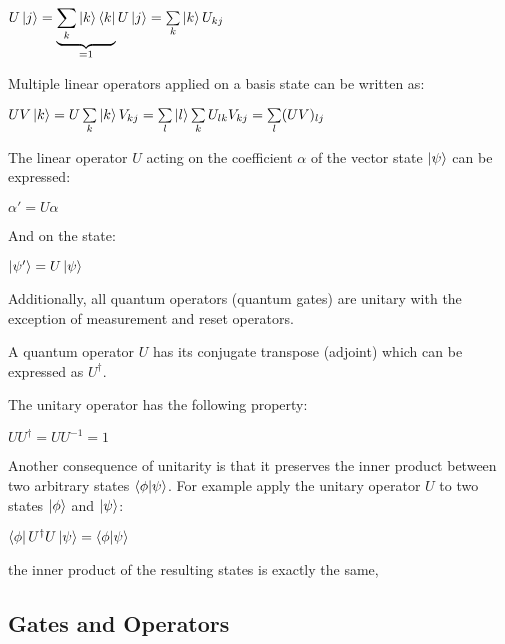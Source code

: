 \documentclass{article}
\begin{document}
\qquad $U\ket{j} = \underbrace{\sum\limits_k\ket{k}\bra{k}}_{ = 1} U\ket{j} = \sum\limits_k \ket{k} U_{kj}$
\vspace{5mm}

\noindent
Multiple linear operators applied on a basis state can be written as:
\vspace{5mm}

\qquad $UV\ket{k} = U\sum\limits_k \ket{k}V_{kj} = \sum\limits_l\ket{l} \sum\limits_k U_{lk} V_{kj} = \sum\limits_l(UV)_{lj}$
\vspace{5mm}

\noindent
The linear operator $U$ acting on the coefficient $\alpha$ of the vector state $\ket{\psi}$ can be expressed:
\vspace{5mm}

\qquad $\alpha' = U\alpha$
\vspace{5mm}

\noindent
And on the state:
\vspace{5mm}

\qquad $\ket{\psi'} = U\ket{\psi}$
\pagebreak

\noindent
Additionally, all quantum operators (quantum gates) are unitary with the exception of measurement and reset operators. 
\vspace{5mm}

\noindent
A quantum operator $U$ has its conjugate transpose (adjoint) which can be expressed as $U^{\dagger}$.
\vspace{5mm}

\noindent
The unitary operator has the following property\cite{noauthor_unitary_2022}:
\vspace{5mm}

\qquad $UU^{\dagger} = UU^{-1} = 1$
\vspace{5mm}

\noindent
Another consequence of unitarity is that it preserves the inner product between two arbitrary states $\braket{\phi}{\psi}$. For example apply the unitary operator $U$ to two states $\ket{\phi}$ and $\ket{\psi}$:
\vspace{5mm}

\qquad $ \bra{\phi} U^{\dagger} U\ket{\psi} = \braket{\phi}{\psi}$
\vspace{5mm}

\noindent
the inner product of the resulting states is exactly the same,
\vspace{10mm}


\subsection{Gates and Operators}
\vspace{5mm}
\end{document}
